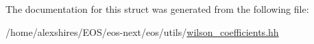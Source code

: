 \label{structeos_1_1WilsonCoefficients_3_01BToS_01_4_ad55e5edfe673a97fe71981a429cb7152}


The documentation for this struct was generated from the following file:\begin{DoxyCompactItemize}
\item 
/home/alexshires/EOS/eos-\/next/eos/utils/\hyperlink{wilson__coefficients_8hh}{wilson\_\-coefficients.hh}\end{DoxyCompactItemize}
